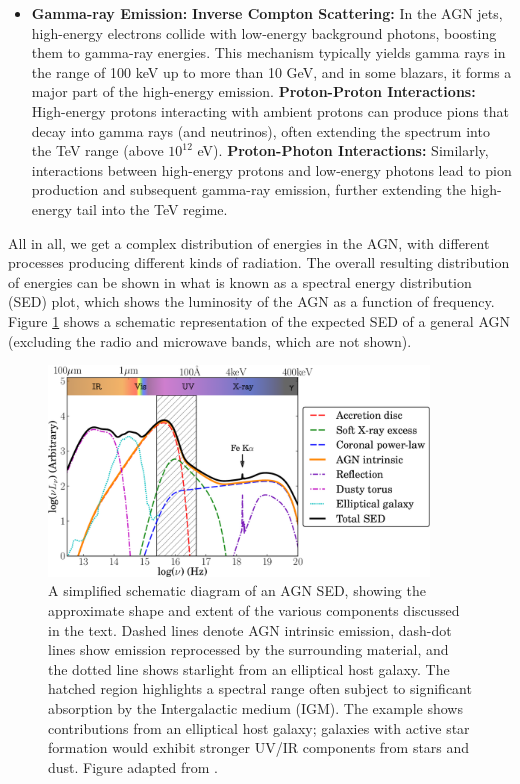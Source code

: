 \begin{itemize}
    \item \textbf{Gamma-ray Emission:}
    \subitem \textbf{Inverse Compton Scattering:} In the AGN jets, high-energy electrons collide with low-energy background photons, boosting them to gamma-ray energies. This mechanism typically yields gamma rays in the range of 100 keV up to more than 10 GeV, and in some blazars, it forms a major part of the high-energy emission.
    \subitem \textbf{Proton-Proton Interactions:} High-energy protons interacting with ambient protons can produce pions that decay into gamma rays (and neutrinos), often extending the spectrum into the TeV range (above $10^{12}$ eV). 
    \subitem \textbf{Proton-Photon Interactions:} Similarly, interactions between high-energy protons and low-energy photons lead to pion production and subsequent gamma-ray emission, further extending the high-energy tail into the TeV regime.
\end{itemize}

All in all, we get a complex distribution of energies in the AGN, with different processes producing different kinds of radiation. The overall resulting distribution of energies can be shown in what is known as a spectral energy distribution (SED) plot, which shows the luminosity of the AGN as a function of frequency. Figure \ref{fig:AGN_SED} shows a schematic representation of the expected SED of a general AGN (excluding the radio and microwave bands, which are not shown).

\begin{figure}[H]
    \centering
    \includegraphics[width=0.9\textwidth]{Figures/AGN SED.png}
    \caption{A simplified schematic diagram of an AGN SED, showing the approximate shape and extent of the various components discussed in the text. Dashed lines denote AGN intrinsic emission, dash-dot lines show emission reprocessed by the surrounding material, and the dotted line shows starlight from an elliptical host galaxy. The hatched region highlights a spectral range often subject to significant absorption by the Intergalactic medium (IGM). The example shows contributions from an elliptical host galaxy; galaxies with active star formation would exhibit stronger UV/IR components from stars and dust. Figure adapted from \citet{QuasarSEDCollinson_2016}.}
    \label{fig:AGN_SED}
\end{figure}

